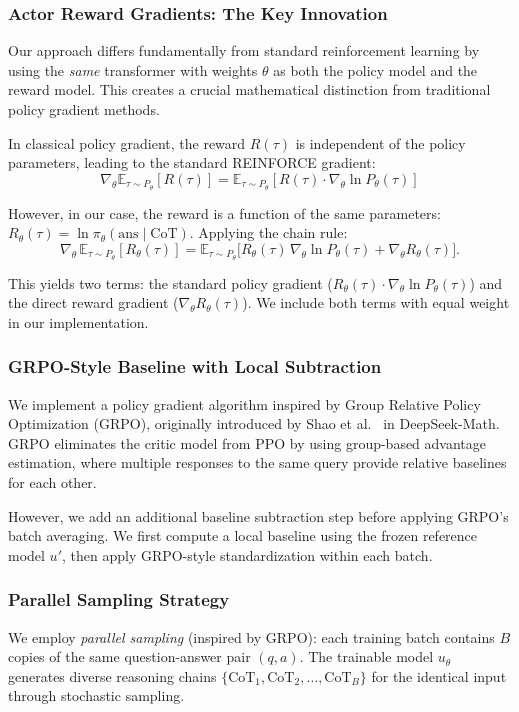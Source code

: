 \documentclass{article} %
\begin{document}
\subsubsection{Actor Reward Gradients: The Key Innovation}
Our approach differs fundamentally from standard reinforcement learning by using the \emph{same} transformer with weights $\theta$ as both the policy model and the reward model. This creates a crucial mathematical distinction from traditional policy gradient methods.

In classical policy gradient, the reward $R(\tau)$ is independent of the policy parameters, leading to the standard REINFORCE gradient:
$$\nabla_\theta \mathbb{E}_{\tau \sim P_\theta}[R(\tau)] = \mathbb{E}_{\tau \sim P_\theta}[R(\tau) \cdot \nabla_\theta \ln P_\theta(\tau)]$$

However, in our case, the reward is a function of the same parameters: $R_\theta(\tau) = \ln \pi_\theta(\text{ans} \mid \text{CoT})$. Applying the chain rule:
\[\nabla_\theta \,\mathbb{E}_{\tau \sim P_\theta}[R_\theta(\tau)]
= \mathbb{E}_{\tau \sim P_\theta}\!\big[R_\theta(\tau)\, \nabla_\theta \ln P_\theta(\tau) + \nabla_\theta R_\theta(\tau)\big].\]

This yields two terms: the standard policy gradient ($R_\theta(\tau) \cdot \nabla_\theta \ln P_\theta(\tau)$) and the direct reward gradient ($\nabla_\theta R_\theta(\tau)$). We include both terms with equal weight in our implementation.

\subsubsection{GRPO-Style Baseline with Local Subtraction}
We implement a policy gradient algorithm inspired by Group Relative Policy Optimization (GRPO), originally introduced by Shao et al.~\cite{shao2024deepseekmath} in DeepSeek-Math. GRPO eliminates the critic model from PPO by using group-based advantage estimation, where multiple responses to the same query provide relative baselines for each other.

However, we add an additional baseline subtraction step before applying GRPO's batch averaging. We first compute a local baseline using the frozen reference model $u'$, then apply GRPO-style standardization within each batch.

\subsubsection{Parallel Sampling Strategy}
\label{subsubsec:parallel}
We employ \emph{parallel sampling} (inspired by GRPO): each training batch contains $B$ copies of the same question-answer pair $(q, a)$. The trainable model $u_\theta$ generates diverse reasoning chains $\{\text{CoT}_1, \text{CoT}_2, \ldots, \text{CoT}_B\}$ for the identical input through stochastic sampling.
\end{document}
